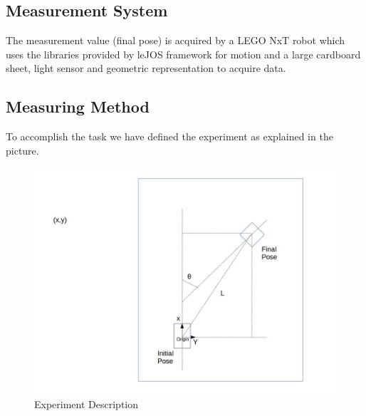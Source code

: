 \documentclass[10pt]{scrartcl}
\begin{document}
\subsection*{Measurement System}

The measurement value (final pose) is acquired by a LEGO NxT robot which uses the libraries provided by leJOS framework for motion and a large cardboard sheet, light sensor and geometric representation to acquire data. 

\subsection*{Measuring Method}

To accomplish the task we have defined the experiment as explained in the picture.\\

\begin{figure}[h!]
\caption{Experiment Description}
\label{fig:2}
\centering
\includegraphics[trim=300 0 0 0, clip,scale=0.35]{images/exp1}
\end{figure}
\end{document}
